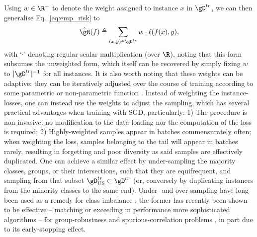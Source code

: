 %
Using \( w \in \R^+ \) to denote the weight assigned to instance \(x\) in \( \gD^{tr} \), we can
then generalise Eq.~\ref{eq:emp_risk} to
\begin{equation*} \label{eq:emp_risk_weighted}
    \hat{\gR}(f) \triangleq \sum_{(x, y) \in \gD^{tr}} w \cdot \ell (f(x), y),
\end{equation*}
%
with `\( \cdot \)' denoting regular scalar multiplication (over \(\R\)), noting that this form
subsumes the unweighted form, which itself can be recovered by simply fixing \(w\) to \(
|\gD^{tr}|^{-1} \) for all instances.
%
It is also worth noting that these weights can be adaptive: they can be iteratively adjusted over
the course of training according to some parametric or non-parametric function
\citep{wang2021importance}.
%
Instead of weighting the instance-losses, one can instead use the weights to adjust the sampling,
which has several practical advantages when training with \ac{SGD}, particularly: 
1) The procedure is non-invasive: no modification to the data-loading nor the computation of the
loss is required;
%
2) Highly-weighted samples appear in batches commensurately often; when weighting the loss, samples
belonging to the tail will appear in batches rarely, resulting in forgetting and poor diversity as
said samples are effectively duplicated.
One can achieve a similar effect by under-sampling the majority classes, groups, or their
intersections, such that they are equifrequent, and \iid{} sampling from that subset \(
\gD^{tr}_{\text{US}} \subset \gD^{tr} \) (or, conversely by duplicating instances from the minority
classes to the same end).
Under- and over-sampling have long been used as a remedy for class imbalance
\citep{chawla2002smote}; the former has recently been shown to be effective -- matching or
exceeding in performance more sophisticated algorithms -- for group-robustness and
spurious-correlation problems \citep{sagawa2020investigation, idrissi2022simple}, in part due to
its early-stopping effect.

